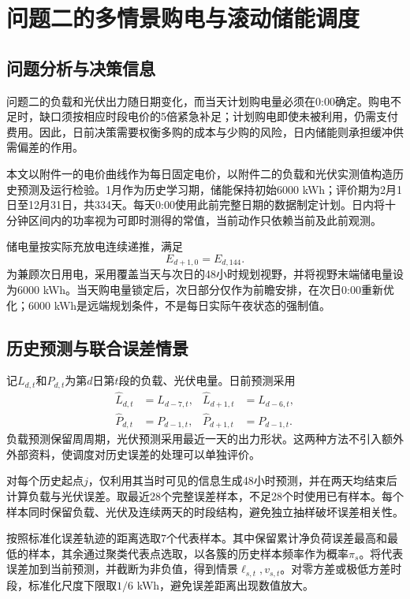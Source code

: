 \section{问题二的多情景购电与滚动储能调度}
\subsection{问题分析与决策信息}
问题二的负载和光伏出力随日期变化，而当天计划购电量必须在0:00确定。购电不足时，缺口须按相应时段电价的5倍紧急补足；计划购电即使未被利用，仍需支付费用。因此，日前决策需要权衡多购的成本与少购的风险，日内储能则承担缓冲供需偏差的作用。

本文以附件一的电价曲线作为每日固定电价，以附件二的负载和光伏实测值构造历史预测及运行检验。1月作为历史学习期，储能保持初始6000 kWh；评价期为2月1日至12月31日，共334天。每天0:00使用此前完整日期的数据制定计划。日内将十分钟区间内的功率视为可即时测得的常值，当前动作只依赖当前及此前观测。

储电量按实际充放电连续递推，满足
\begin{equation}E_{d+1,0}=E_{d,144}.
\end{equation}
为兼顾次日用电，采用覆盖当天与次日的48小时规划视野，并将视野末端储电量设为6000 kWh。当天购电量锁定后，次日部分仅作为前瞻安排，在次日0:00重新优化；6000 kWh是远端规划条件，不是每日实际午夜状态的强制值。

\subsection{历史预测与联合误差情景}
记$L_{d,t}$和$P_{d,t}$为第$d$日第$t$段的负载、光伏电量。日前预测采用
\begin{align}
\widehat L_{d,t}&=L_{d-7,t},&\widehat L_{d+1,t}&=L_{d-6,t},\\
\widehat P_{d,t}&=P_{d-1,t},&\widehat P_{d+1,t}&=P_{d-1,t}.
\end{align}
负载预测保留周周期，光伏预测采用最近一天的出力形状。这两种方法不引入额外外部资料，使调度对历史误差的处理可以单独评价。

对每个历史起点$j$，仅利用其当时可见的信息生成48小时预测，并在两天均结束后计算负载与光伏误差。取最近28个完整误差样本，不足28个时使用已有样本。每个样本同时保留负载、光伏及连续两天的时段结构，避免独立抽样破坏误差相关性。

按照标准化误差轨迹的距离选取7个代表样本。其中保留累计净负荷误差最高和最低的样本，其余通过聚类代表点选取，以各簇的历史样本频率作为概率$\pi_s$。将代表误差加到当前预测，并截断为非负值，得到情景$\ell_{s,t},v_{s,t}$。对零方差或极低方差时段，标准化尺度下限取$1/6$ kWh，避免误差距离出现数值放大。

